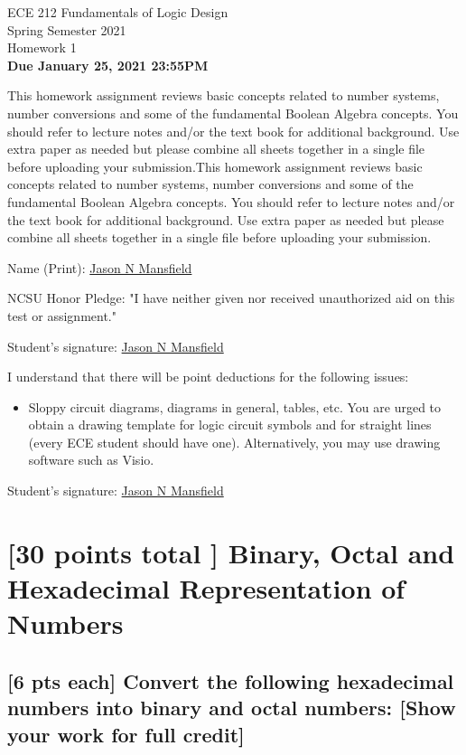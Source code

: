 \documentclass[12pt]{article}
\begin{document}
\begin{center}
	{\Large ECE 212 Fundamentals of Logic Design}\\
	{\large Spring Semester 2021}\\
	{\large Homework 1}\\
	\vspace{1cm}
	\textbf{Due January 25, 2021 23:55PM}
\end{center}
This homework assignment reviews basic concepts related to number systems, number conversions and some of the fundamental Boolean Algebra concepts. You should refer to lecture notes and/or the text book for additional background. Use extra paper as needed but please combine all sheets together in a single file before uploading your submission.This homework assignment reviews basic concepts related to number systems, number conversions and some of the fundamental Boolean Algebra concepts. You should refer to lecture notes and/or the text book for additional background. Use extra paper as needed but please combine all sheets together in a single file before uploading your submission.
\begin{center}
	Name (Print): \underline{Jason N Mansfield}
\end{center}
NCSU Honor Pledge: "I have neither given nor received unauthorized aid on this test or assignment." 
\begin{center}
	Student's signature: \LARGE \wesa \underline{Jason N Mansfield}
\end{center}
I understand that there will be point deductions for the following issues:
	\begin{itemize}
	\item Sloppy circuit diagrams, diagrams in general, tables, etc. You are urged to obtain a drawing template for logic circuit symbols and for straight lines (every ECE student should have one). Alternatively, you may use drawing software such as Visio.
	\end{itemize}
\begin{center}
	Student's signature: \LARGE \wesa \underline{Jason N Mansfield}
\end{center}

\section{[30 points total ] Binary, Octal and Hexadecimal Representation of Numbers}
\subsection{[6 pts each] Convert the following hexadecimal numbers into binary and octal numbers:
[Show your work for full credit]}
\end{document}
